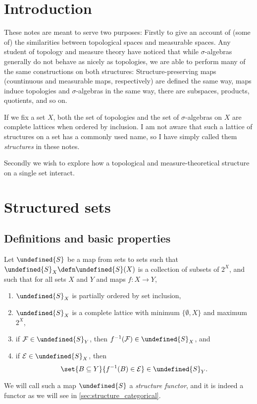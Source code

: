 \documentclass[article, a4paper, 11pt, oneside]{memoir}
\title{\doctitle}
\author{\docauthor}
\let\mathfrak\undefined
\numberwithin{equation}{chapter}
\newcommand{\calE}{\mathcal{E}}
\newcommand{\calF}{\mathcal{F}}
\newcommand{\strucS}{\mathfrak{S}}
\newcommand{\powerset}[1]{2^{#1}}
\begin{document}
\maketitle

\chapter{Introduction}

These notes are meant to serve two purposes: Firstly to give an account of (some of) the similarities between topological spaces and measurable spaces. Any student of topology and measure theory have noticed that while $\sigma$-algebras generally do not behave as nicely as topologies, we are able to perform many of the same constructions on both structures: Structure-preserving maps (countinuous and measurable maps, respectively) are defined the same way, maps induce topologies and $\sigma$-algebras in the same way, there are subspaces, products, quotients, and so on.

If we fix a set $X$, both the set of topologies and the set of $\sigma$-algebras on $X$ are complete lattices when ordered by inclusion. I am not aware that such a lattice of structures on a set has a commonly used name, so I have simply called them \emph{structures} in these notes.

Secondly we wish to explore how a topological and measure-theoretical structure on a single set interact.


\chapter{Structured sets}


\section{Definitions and basic properties}

Let $\strucS$ be a map from sets to sets such that $\strucS_X \defn \strucS(X)$ is a collection of subsets of $\powerset{X}$, and such that for all sets $X$ and $Y$ and maps $f \colon X \to Y$,
%
\begin{enumerate}
    \item $\strucS_X$ is partially ordered by set inclusion,
    
    \item $\strucS_X$ is a complete lattice with minimum $\{\emptyset, X\}$ and maximum $2^X$,
    
    \item\label{enum:structure_def_pullback} if $\calF \in \strucS_Y$, then $f^{-1}(\calF) \in \strucS_X$, and
    
    \item\label{enum:structure_def_pushforward} if $\calE \in \strucS_X$, then
    \begin{equation*}
        \set{B \subseteq Y}{f^{-1}(B) \in \calE} \in \strucS_Y.
    \end{equation*}
\end{enumerate}
%
We will call such a map $\strucS$ a \emph{structure functor}, and it is indeed a functor as we will see in \cref{sec:structure_categorical}.
\end{document}
